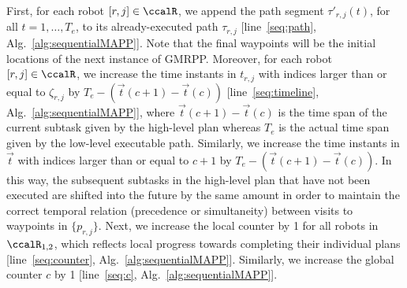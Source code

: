 \documentclass[Afour,sageh,times]{sagej}
\newcommand{\vertex}[1]{v_{\textup{#1}}}
\begin{document}
{{{%

  First, for each robot $[r, j] \in \ccalR$, we append the path segment $\tau'_{r,j}(t)$, for all $t=1,\ldots, T_e$, to its already-executed path $\tau_{r,j}$ [line~\ref{seq:path}, Alg.~\ref{alg:sequentialMAPP}]. %
 Note that the final waypoints will be the initial locations of the next instance of GMRPP.  Moreover, for each robot $[r,j] \in \ccalR$, we increase the time instants in $t_{r,j}$ with indices larger than or equal to  $\zeta_{r,j}$ by $T_e - (\vec{t}(c+1) - \vec{t}(c))$ [line~\ref{seq:timeline}, Alg.~\ref{alg:sequentialMAPP}], where $\vec{t}(c+1) - \vec{t}(c)$ is the time span of the current subtask  given by the high-level plan whereas $T_e$ is the actual time span given by the low-level executable path.
    Similarly, we increase the time instants in $\vec{t}$ with indices larger than or equal to  $c+1$ by $T_e - (\vec{t}(c+1)- \vec{t}(c))$.
    In this way,  the subsequent subtasks in the high-level plan  that have not been executed are shifted into the future by the same amount in order to maintain the correct temporal relation (precedence or simultaneity) between visits to waypoints in $\{p_{r,j}\}$. Next, we increase  the local counter by 1 for all robots in $\ccalR_{1,2}$, which reflects local progress towards completing their individual plans [line~\ref{seq:counter}, Alg.~\ref{alg:sequentialMAPP}]. Similarly, we increase the global counter $c$ by 1 [line~\ref{seq:c}, Alg.~\ref{alg:sequentialMAPP}].}




}}
\end{document}
